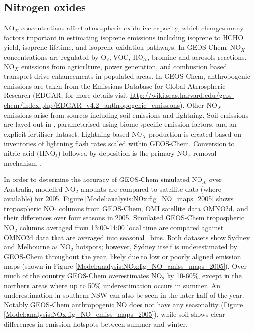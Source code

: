   \subsection{Nitrogen oxides}
    \label{Model:GC:NOx}
    NO$_X$ concentrations affect atmospheric oxidative capacity, which changes many factors important in estimating isoprene emissions including isoprene to HCHO yield, isoprene lifetime, and isoprene oxidation pathways.
    In GEOS-Chem, NO$_X$ concentrations are regulated by O$_3$, VOC, HO$_X$, bromine and aerosols reactions.
    NO$_X$ emissions from agriculture, power generation, and combustion based transport drive enhancements in populated areas.
    In GEOS-Chem, anthropogenic emissions are taken from the Emissions Database for Global Atmospheric Research (EDGAR, for more details visit \url{http://wiki.seas.harvard.edu/geos-chem/index.php/EDGAR_v4.2_anthropogenic_emissions}).
    Other NO$_X$ emissions arise from sources including soil emissions %
    and lightning.
    Soil emissions are layed out in \textcite{Hudman2012}, parameterised using biome specific emission factors, and an explicit fertiliser dataset.
    Lightning based NO$_X$ production is created based on inventories of lightning flash rates scaled within GEOS-Chem.
    Conversion to nitric acid (HNO$_3$) followed by deposition is the primary NO$_x$ removal mechanism \parencite{Delmas1997, Ayers2006}.
    
    In order to determine the accuracy of GEOS-Chem simulated NO$_X$ over Australia, modelled NO$_2$ amounts are compared to satellite data (where available) for 2005.
    Figure \ref{Model:analysis:NOx:fig_NO_maps_2005} shows tropospheric NO$_2$ columns from GEOS-Chem, OMI satellite data OMNO2d, and their differences over four seasons in 2005.
    Simulated GEOS-Chem tropospheric NO$_2$ columns averaged from 13:00-14:00 local time are compared against OMNO2d data that are averaged into seasonal \lowhr ~bins. %
    Both datasets show Sydney and Melbourne as NO$_2$ hotspots; however, Sydney itself is underestimated by GEOS-Chem throughout the year, likely due to low or poorly aligned emission maps (shown in Figure \ref{Model:analysis:NOx:fig_NO_emiss_maps_2005}).
    Over much of the country GEOS-Chem overestimates NO$_2$ by 10-60\%, except in the northern areas where up to 50\% underestimation occurs in summer.
    An underestimation in southern NSW can also be seen in the later half of the year.
    Notably GEOS-Chem anthropogenic NO does not have any seasonality (Figure \ref{Model:analysis:NOx:fig_NO_emiss_maps_2005}), while soil shows clear differences in emission hotspots between summer and winter.
    
